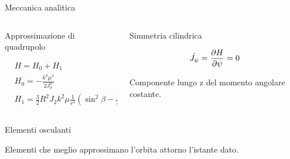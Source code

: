 \begin{frame}{Meccanica analitica}

\begin{columns}  \begin{column}{0.5\textwidth}

\begin{block}{Approssimazione di quadrupolo}

\begin{align*}
&H=H_0+H_1\\
&H_0=-\frac{k^4\mu^3}{2J_{\phi}^2}\\
&H_1=\frac{3}{2}R^2J_2k^2\mu\frac{1}{r^3}(\sin^2{\beta}-\frac{1}{3})
\end{align*}


\end{block}

\end{column}

\begin{column}{0.5\textwidth}

\begin{block}{Simmetria cilindrica}

\begin{equation*}
\dot{J_{\psi}}=\frac{\partial H}{\partial \psi}=0
\end{equation*}

Componente lungo z del momento angolare costante.

\end{block}


\end{column}  \end{columns}

\begin{block}{Elementi osculanti}

Elementi che meglio approssimano l'orbita attorno l'istante dato.

\end{block}


\end{frame}



